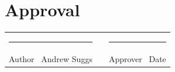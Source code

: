 \documentclass[11pt,letterpaper]{article}
\newcommand{\reqName}{Andrew Suggs}
\begin{document}
	\section{Approval}
	
	\vspace{22pt}
	\begin{tabularx}{\textwidth}{@{}X c X@{}}
		\rule{\linewidth}{0.4pt} & \hspace{6pt} & \rule{\linewidth}{0.4pt} \\
		\textsf{\footnotesize\color{soft}Author \textbullet\ \reqName} & &
		\textsf{\footnotesize\color{soft}Approver \textbullet\ Date} \\
	\end{tabularx}
	
\end{document}
